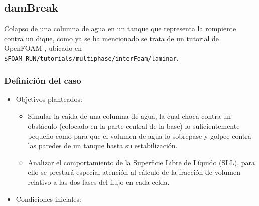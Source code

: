 \subsection{damBreak}\label{header-n531}

Colapso de una columna de agua en un tanque que representa la rompiente
contra un dique, como ya se ha mencionado se trata de un tutorial de
OpenFOAM \cite{dambreak}, ubicado en
\lstinline[style=bash]{$FOAM_RUN/tutorials/multiphase/interFoam/laminar}.

\subsubsection{Definición del caso}\label{header-n536}

\begin{itemize}
\item
  Objetivos planteados:

  \begin{itemize}
  \item
    Simular la caida de una columna de agua, la cual choca contra un
    obstáculo (colocado en la parte central de la base) lo
    suficientemente pequeño como para que el volumen de agua lo
    sobrepase y golpee contra las paredes de un tanque hasta su
    estabilización.
  \item
    Analizar el comportamiento de la Superficie Libre de Líquido (SLL),
    para ello se prestará especial atención al cálculo de la fracción de
    volumen relativo a las dos fases del flujo en cada celda.
  \end{itemize}
\item
  Condiciones iniciales:


\end{itemize}
